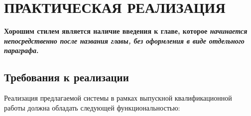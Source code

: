 

\chapter{ПРАКТИЧЕСКАЯ РЕАЛИЗАЦИЯ} \label{ch:ch2}

\textbf{Хорошим стилем является наличие введения к главе, которое \textit{начинается непосредственно после названия главы, без оформления в виде отдельного параграфа}.}

\section{Требования к реализации} \label{sec:requirements} %

Реализация предлагаемой системы в рамках выпускной квалификационной работы должна обладать следующей функциональностью:

